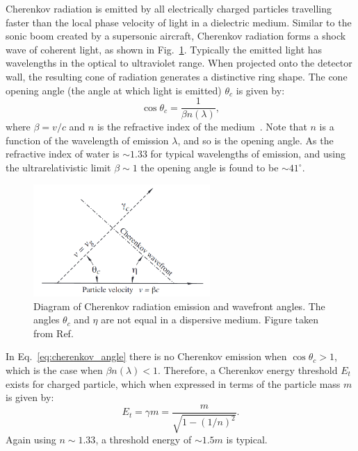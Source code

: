 Cherenkov radiation is emitted by all electrically charged particles travelling faster than the
local phase velocity of light in a dielectric medium. Similar to the sonic boom created by a
supersonic aircraft, Cherenkov radiation forms a shock wave of coherent light, as shown in
Fig.~\ref{fig:cherenkov}. Typically the emitted light has wavelengths in the optical to
ultraviolet range. When projected onto the detector wall, the resulting cone of radiation
generates a distinctive ring shape. The cone opening angle (the angle at which light is emitted)
$\theta_{c}$ is given by:
\begin{equation}
    \cos\theta_{c} = \frac{1}{\beta n(\lambda)},
    \label{eq:cherenkov_angle}
\end{equation}
where $\beta=v/c$ and $n$ is the refractive index of the medium~\cite{particle2020}. Note that $n$
is a function of the wavelength of emission $\lambda$, and so is the opening angle. As the
refractive index of water is $\sim 1.33$ for typical wavelengths of emission, and using the
ultrarelativistic limit $\beta\sim 1$ the opening angle is found to be $\sim41^{\circ}$.

\begin{figure} %
    \includegraphics[width=0.6\textwidth]{diagrams/4-chips/cherenkov.png}
    \caption[Diagram of Cherenkov radiation emission]
    {Diagram of Cherenkov radiation emission and wavefront angles. The angles $\theta_{c}$ and
        $\eta$ are not equal in a dispersive medium. Figure taken from Ref.~\cite{particle2020}}
    \label{fig:cherenkov}
\end{figure}

In Eq.~\ref{eq:cherenkov_angle} there is no Cherenkov emission when $\cos\theta_{c} > 1$, which is
the case when $\beta n(\lambda)<1$. Therefore, a Cherenkov energy threshold $E_{t}$ exists for
charged particle, which when expressed in terms of the particle mass $m$ is given by:
\begin{equation}
    E_{t} = \gamma m = \frac{m}{\sqrt{1-(1/n)^{2}}}.
    \label{eq:cherenkov_threshold}
\end{equation}
Again using $n\sim 1.33$, a threshold energy of $\sim1.5m$ is typical.

